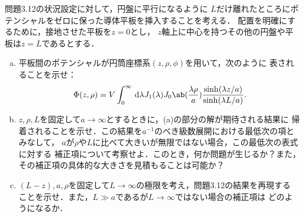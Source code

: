 \begin{bx1}
  問題3.12の状況設定に対して，円盤に平行になるように
  $L$だけ離れたところにポテンシャルをゼロに保った導体平板を挿入することを考える．
  配置を明確にするために，接地させた平板を$z = 0$とし，
  $z$軸上に中心を持つその他の円盤や平板は$z = L$であるとする．
  \begin{enumerate}[(a)]%
    \item
      平板間のポテンシャルが円筒座標系$(z, \rho, \phi)$を用いて，次のように
      表されることを示せ：
      \begin{gather}%
        \Phi(z, \rho) = V \int_0^\infty \dl{\lambda} J_1(\lambda) J_0 \ab(\frac{\lambda \rho}{a}) \frac{\sinh(\lambda z / a)}{\sinh(\lambda L/a)}.
      \end{gather}%
    \item 
      $z, \rho, L$を固定して$a \to \infty$とするときに，(a)の部分の解が期待される結果に
      帰着されることを示せ．この結果を$a^{-1}$のべき級数展開における最低次の項とみなして，
      $a$が$\rho$や$L$に比べて大きいが無限ではない場合，この最低次の表式に対する
      補正項について考察せよ．このとき，何か問題が生じるか？また，
      その補正項の具体的な大きさを見積もることは可能か？
    \item 
      $(L-z), a, \rho$を固定して$L \to \infty$の極限を考え，問題3.12の結果を再現する
      ことを示せ．また，$L \gg a$であるが$L \to \infty$ではない場合の補正項は
      どのようになるか．
  \end{enumerate}%
\end{bx1}
\clearpage
